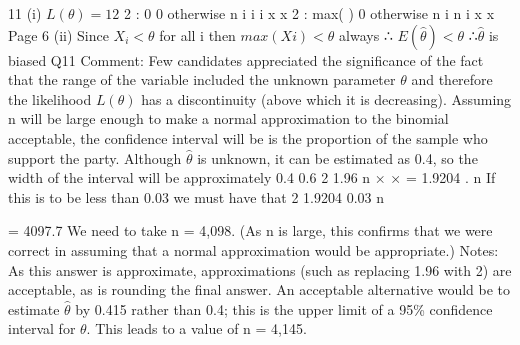 \documentclass[a4paper,12pt]{article}
\begin{document}
11 (i) $L(\theta) = 1 2$
2
: 0
0 otherwise
n
i
i i
x
x
2
: max( )
0 otherwise
n
i
n i
x
x
Page 6
(ii) Since $X_i < \theta$ for all i
then $max(Xi) < \theta$ always
∴ $E( \hat{\theta}) < \theta$ ∴$\hat{\theta}$ is biased
Q11 Comment: Few candidates appreciated the significance of the fact that the range of the
variable included the unknown parameter $\theta$ and therefore the likelihood $L(\theta)$ has a
discontinuity (above which it is decreasing).
 Assuming n will be large enough to make a normal approximation to the
binomial acceptable, the confidence interval will be
is the proportion of the sample who support the party.
Although $\hat{\theta}$ is unknown, it can be estimated as 0.4, so the width of the interval
will be approximately
0.4 0.6
2 1.96
n
× × =
1.9204
.
n
If this is to be less than 0.03 we must have that
2 1.9204
0.03
n

= 4097.7
We need to take n = 4,098.
(As n is large, this confirms that we were correct in assuming that a normal
approximation would be appropriate.)
Notes: As this answer is approximate, approximations (such as replacing 1.96
with 2) are acceptable, as is rounding the final answer.
An acceptable alternative would be to estimate $\hat{\theta}$ by 0.415 rather than 0.4; this
is the upper limit of a 95\% confidence interval for $\theta$. This leads to a value of
n = 4,145.
\end{document}
